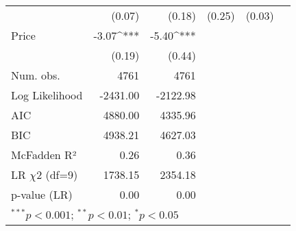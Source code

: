 \begin{table}[h]
\begin{center}
\begin{tabular}{l D{.}{.}{5.5} D{.}{.}{5.5} D{.}{.}{2.5} D{.}{.}{2.5} D{.}{.}{3.2}}
                                   & (0.07)      & (0.18)      & (0.25)      & (0.03)     &        \\
Price                              & -3.07^{***} & -5.40^{***} &             &            &        \\
                                   & (0.19)      & (0.44)      &             &            &        \\
\midrule
Num. obs.                          & 4761        & 4761        &             &            &        \\
Log Likelihood                     & -2431.00    & -2122.98    &             &            &        \\
AIC                                & 4880.00     & 4335.96     &             &            &        \\
BIC                                & 4938.21     & 4627.03     &             &            &        \\
McFadden R²                        & 0.26        & 0.36        &             &            &        \\
LR $\chi 2$ (df=9)                       & 1738.15     & 2354.18     &             &            &        \\
p-value (LR)                       & 0.00        & 0.00        &             &            &        \\
\bottomrule
{}
\end{tabular}
\end{center}
\end{table}
